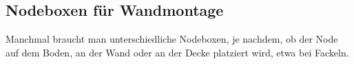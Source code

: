 \subsection{Nodeboxen für
Wandmontage}\label{nodeboxen-fuxfcr-wandmontage}

Manchmal braucht man unterschiedliche Nodeboxen, je nachdem, ob der Node
auf dem Boden, an der Wand oder an der Decke platziert wird, etwa bei
Fackeln.

\begin{Shaded}
\begin{Highlighting}[]
\OperatorTok{(}\OperatorTok{,} \OperatorTok{\{}
     \OperatorTok{=} \OperatorTok{,}
     \OperatorTok{=} \OperatorTok{\{}
         \OperatorTok{=} \OperatorTok{,}

         \OperatorTok{=} \OperatorTok{\{}
            \OperatorTok{\{}
                \OperatorTok{{-}}\OperatorTok{,}
                \OperatorTok{,}
                \OperatorTok{{-}}\OperatorTok{,}
                \OperatorTok{,}
                \OperatorTok{,}
                \OperatorTok{,}
            \OperatorTok{\},}
        \OperatorTok{\},}

         \OperatorTok{=} \OperatorTok{\{}
            \OperatorTok{\{}
                \OperatorTok{{-}}\OperatorTok{,}
                \OperatorTok{{-}}\OperatorTok{,}
                \OperatorTok{{-}}\OperatorTok{,}
                \OperatorTok{,}
                \OperatorTok{{-}}\OperatorTok{,}
                \OperatorTok{,}
            \OperatorTok{\},}
        \OperatorTok{\},}

         \OperatorTok{=} \OperatorTok{\{}
            \OperatorTok{\{}
                \OperatorTok{{-}}\OperatorTok{,}
                \OperatorTok{{-}}\OperatorTok{,}
                \OperatorTok{{-}}\OperatorTok{,}
                \OperatorTok{{-}}\OperatorTok{,}
                \OperatorTok{,}
                \OperatorTok{,}
            \OperatorTok{\},}
        \OperatorTok{\},}
    \OperatorTok{\},}
\OperatorTok{\})}
\end{Highlighting}
\end{Shaded}

